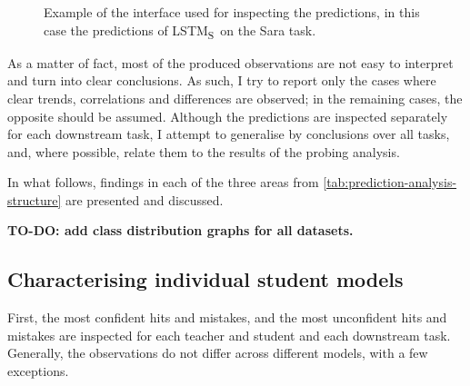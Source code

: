\documentclass[bsc,frontabs,singlespacing,parskip,deptreport]{infthesis}
\def\LSTMS{LSTM\textsubscript{S}}
\begin{document}
{{    \begin{figure}[h!tb]
      \centering
      \caption{Example of the interface used for inspecting the predictions, in this case the predictions of \LSTMS~on the Sara task.}
      \label{fig:prediction-analysis-example}
    \end{figure}
    
    As a matter of fact, most of the produced observations are not easy to interpret and turn into clear conclusions.
    As such, I try to report only the cases where clear trends, correlations and differences are observed; in the remaining cases, the opposite should be assumed.
    Although the predictions are inspected separately for each downstream task, I attempt to generalise by conclusions over all tasks, and, where possible, relate them to the results of the probing analysis.

    In what follows, findings in each of the three areas from \autoref{tab:prediction-analysis-structure} are presented and discussed.
    
    \textbf{TO-DO: add class distribution graphs for all datasets.}
    \subsection{Characterising individual student models}{
      First, the most confident hits and mistakes, and the most unconfident hits and mistakes are inspected for each teacher and student and each downstream task. 
      Generally, the observations do not differ across different models, with a few exceptions.
      
}}}
\end{document}
